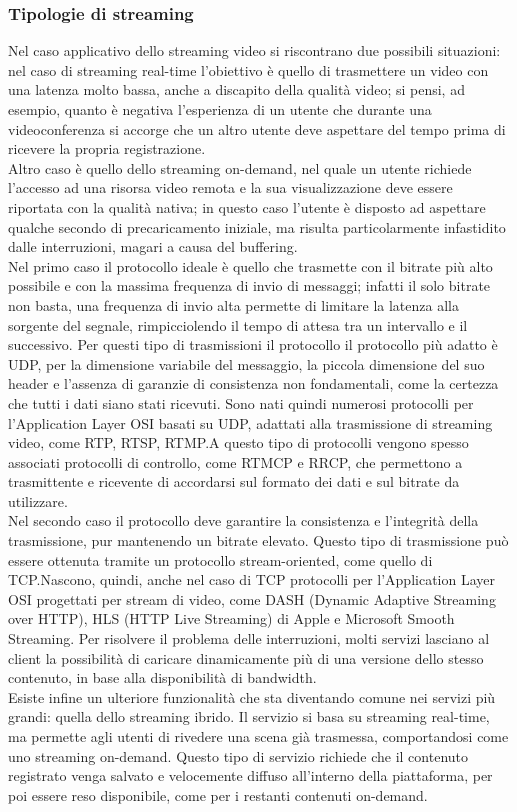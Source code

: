       \subsubsection{Tipologie di streaming}
      Nel caso applicativo dello streaming video si riscontrano due possibili situazioni:
      nel caso di streaming real-time l'obiettivo è quello di trasmettere un video con una latenza molto bassa, anche a discapito della qualità video; si pensi, ad esempio, quanto è negativa l'esperienza di un utente che durante una videoconferenza si accorge che un altro utente deve aspettare del tempo prima di ricevere la propria registrazione.
      \\
      Altro caso è quello dello streaming on-demand, nel quale un utente richiede l'accesso ad una risorsa video remota e la sua visualizzazione deve essere riportata con la qualità nativa; in questo caso l'utente è disposto ad aspettare qualche secondo di precaricamento iniziale, ma risulta particolarmente infastidito dalle interruzioni, magari a causa del buffering.
      \\
      Nel primo caso il protocollo ideale è quello che trasmette con il bitrate più alto possibile e con la massima frequenza di invio di messaggi; infatti il solo bitrate non basta, una frequenza di invio alta permette di limitare la latenza alla sorgente del segnale, rimpicciolendo il tempo di attesa tra un intervallo e il successivo. Per questi tipo di trasmissioni il protocollo il protocollo più adatto è UDP, per la dimensione variabile del messaggio, la piccola dimensione del suo header e l'assenza di garanzie di consistenza non fondamentali, come la certezza che tutti i dati siano stati ricevuti. Sono nati quindi numerosi protocolli per l'Application Layer OSI basati su UDP, adattati alla trasmissione di streaming video, come RTP, RTSP, RTMP.\@ A questo tipo di protocolli vengono spesso associati protocolli di controllo, come RTMCP e RRCP, che permettono a trasmittente e ricevente di accordarsi sul formato dei dati e sul bitrate da utilizzare.
      \\
      Nel secondo caso il protocollo deve garantire la consistenza e l'integrità della trasmissione, pur mantenendo un bitrate elevato. Questo tipo di trasmissione può essere ottenuta tramite un protocollo stream-oriented, come quello di TCP.\@ Nascono, quindi, anche nel caso di TCP protocolli per l'Application Layer OSI progettati per stream di video, come DASH (Dynamic Adaptive Streaming over HTTP), HLS (HTTP Live Streaming) di Apple e Microsoft Smooth Streaming. Per risolvere il problema delle interruzioni, molti servizi lasciano al client la possibilità di caricare dinamicamente più di una versione dello stesso contenuto, in base alla disponibilità di bandwidth.
      \\
      Esiste infine un ulteriore funzionalità che sta diventando comune nei servizi più grandi: quella dello streaming ibrido. Il servizio si basa su streaming real-time, ma permette agli utenti di rivedere una scena già trasmessa, comportandosi come uno streaming on-demand. Questo tipo di servizio richiede che il contenuto registrato venga salvato e velocemente diffuso all'interno della piattaforma, per poi essere reso disponibile, come per i restanti contenuti on-demand.

